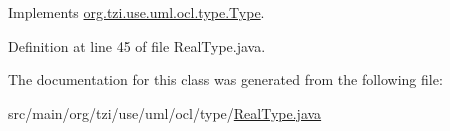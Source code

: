 Implements \hyperlink{interfaceorg_1_1tzi_1_1use_1_1uml_1_1ocl_1_1type_1_1_type_a3424c0268446b71992f4e9de4cce856c}{org.\-tzi.\-use.\-uml.\-ocl.\-type.\-Type}.



Definition at line 45 of file Real\-Type.\-java.



The documentation for this class was generated from the following file\-:\begin{DoxyCompactItemize}
\item 
src/main/org/tzi/use/uml/ocl/type/\hyperlink{_real_type_8java}{Real\-Type.\-java}\end{DoxyCompactItemize}
